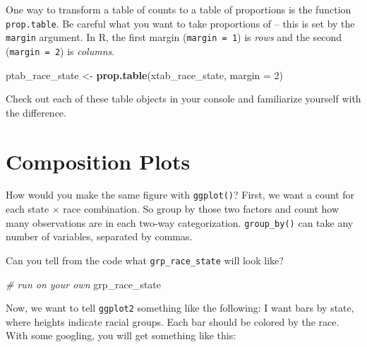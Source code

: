 \documentclass[
]{book}
\newenvironment{Shaded}{\begin{snugshade}}{\end{snugshade}}
\newcommand{\CommentTok}[1]{\textcolor[rgb]{0.56,0.35,0.01}{\textit{#1}}}
\newcommand{\DataTypeTok}[1]{\textcolor[rgb]{0.13,0.29,0.53}{#1}}
\newcommand{\DecValTok}[1]{\textcolor[rgb]{0.00,0.00,0.81}{#1}}
\newcommand{\KeywordTok}[1]{\textcolor[rgb]{0.13,0.29,0.53}{\textbf{#1}}}
\newcommand{\NormalTok}[1]{#1}
\newcommand{\OperatorTok}[1]{\textcolor[rgb]{0.81,0.36,0.00}{\textbf{#1}}}
\newcommand{\StringTok}[1]{\textcolor[rgb]{0.31,0.60,0.02}{#1}}
\theoremstyle{definition}
\theoremstyle{definition}
\theoremstyle{definition}
\theoremstyle{definition}
\theoremstyle{remark}
\begin{document}
One way to transform a table of counts to a table of proportions is the function \texttt{prop.table}. Be careful what you want to take proportions of -- this is set by the \texttt{margin} argument. In R, the first margin (\texttt{margin\ =\ 1}) is \emph{rows} and the second (\texttt{margin\ =\ 2}) is \emph{columns}.

\begin{Shaded}
\begin{Highlighting}[]
\NormalTok{ptab_race_state <-}\StringTok{ }\KeywordTok{prop.table}\NormalTok{(xtab_race_state, }\DataTypeTok{margin =} \DecValTok{2}\NormalTok{)}
\end{Highlighting}
\end{Shaded}

Check out each of these table objects in your console and familiarize yourself with the difference.

\hypertarget{composition-plots}{%
\section{Composition Plots}\label{composition-plots}}

How would you make the same figure with \texttt{ggplot()}? First, we want a count for each state \(\times\) race combination. So group by those two factors and count how many observations are in each two-way categorization. \texttt{group\_by()} can take any number of variables, separated by commas.

\begin{Shaded}
\end{Shaded}

Can you tell from the code what \texttt{grp\_race\_state} will look like?

\begin{Shaded}
\begin{Highlighting}[]
\CommentTok{# run on your own}
\NormalTok{grp_race_state}
\end{Highlighting}
\end{Shaded}

Now, we want to tell \texttt{ggplot2} something like the following: I want bars by state, where heights indicate racial groups. Each bar should be colored by the race. With some googling, you will get something like this:
\end{document}
